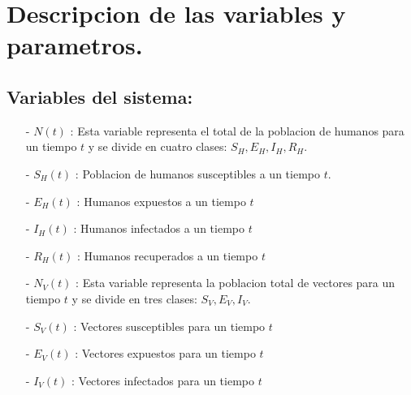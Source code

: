 	\section{Descripcion de las variables y parametros.}
		\subsection{\textbf{Variables del sistema:}}
			\begin{enumerate}
				\item[-]
				$N(t)$ :  Esta variable representa el total de la poblacion de humanos para un tiempo $t$ y se divide en cuatro clases: $S_H, E_H, I_H, R_H$.
				\item[-]
				$S_H(t)$ : Poblacion de humanos susceptibles a un tiempo $t$. 
				\item[-]
				$E_H(t)$ : Humanos expuestos a un tiempo $t$
				\item[-]
				$I_H(t)$ : Humanos infectados a un tiempo $t$
				\item[-]
				$R_H(t)$ : Humanos recuperados a un tiempo $t$
				\item[-]
				$N_V (t)$ : Esta variable representa la poblacion total de vectores para un tiempo $t$ y se divide en tres clases: $S_V, E_V, I_V$.	
				\item[-]
				$S_V (t)$ : Vectores susceptibles para un tiempo $t$
				\item[-]
				$E_V (t)$ : Vectores expuestos para un tiempo $t$
				\item[-]
				$I_V (t)$ : Vectores infectados para un tiempo $t$
			\end{enumerate}
